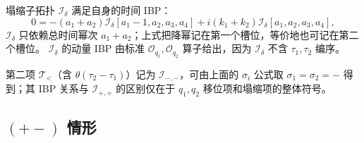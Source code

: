 ﻿\documentclass[a4paper,11pt]{article}
\begin{document}
塌缩子拓扑 $\mathcal{I}_{\delta}$ 满足自身的时间 IBP：
\begin{equation}
    0=-(a_1+a_2)\mathcal{I}_{\delta}[a_1-1,a_2,a_3,a_4]+i(k_1+k_2)\mathcal{I}_{\delta}[a_1,a_2,a_3,a_4],
\end{equation}
$\mathcal{I}_{\delta}$ 只依赖总时间幂次 $a_1+a_2$；上式把降幂记在第一个槽位，等价地也可记在第二个槽位。
$\mathcal{I}_{\delta}$ 的动量 IBP 由标准 $\mathcal{O}_{q_1},\mathcal{O}_{q_2}$ 算子给出，因为 $\mathcal{I}_{\delta}$ 不含 $\tau_1,\tau_2$ 编序。

第二项 $\mathcal{T}_<$（含 $\theta(\tau_2-\tau_1)$）记为 $\mathcal{I}_{-,-}$，可由上面的 $\sigma_i$ 公式取 $\sigma_1=\sigma_2=-$ 得到；其 IBP 关系与 $\mathcal{I}_{+,+}$ 的区别仅在于 $q_1,q_2$ 移位项和塌缩项的整体符号。

\subsection{$(+-)$ 情形}
\end{document}
